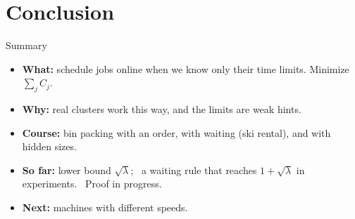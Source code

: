 \documentclass[12pt]{beamer}   %
\begin{document}
\section{Conclusion}

\begin{frame}{Summary}
  \begin{itemize}\setlength{\itemsep}{2mm}
    \item<1-> \textbf{What:} schedule jobs online when we know only their time limits. Minimize $\sum_j C_j$.
    \item<2-> \textbf{Why:} real clusters work this way, and the limits are weak hints.
    \item<3-> \textbf{Course:} bin packing with an order, with waiting (ski rental), and with hidden sizes.
    \item<4-> \textbf{So far:} lower bound $\sqrt{\lambda}$; \ a waiting rule that reaches $1 + \sqrt{\lambda}$ in experiments. \ {\color{navy}Proof in progress.}
    \item<5-> \textbf{Next:} machines with different speeds.
  \end{itemize}
  \vspace{2mm}
  \centering
\end{frame}
\end{document}
